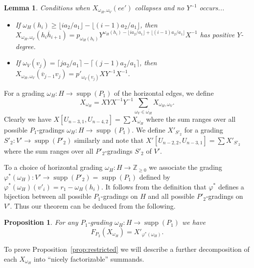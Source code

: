 \documentclass{amsart}
\newtheorem{lemma}[theorem]{Lemma}
\newtheorem{proposition}[theorem]{Proposition}
\newcommand{\ZZ}{\mathbb{Z}}
\newcommand{\supp}{\operatorname{supp}}
\begin{document}
 \begin{lemma}
  Conditions when $X_{\omega_H,\omega_V}(ee')$ collapses and no $Y^{-1}$ occurs...
  \begin{itemize}
   \item If $\omega_H(h_i)\ge\lfloor ia_2/a_1\rfloor-\lfloor (i-1)a_2/a_1\rfloor$, then $X_{\omega_H,\omega_V}(h_i\overline{h}_{i+1})=p_{\omega_H(h_i)}Y^{\omega_H(h_i)-\lfloor ia_2/a_1\rfloor+\lfloor (i-1)a_2/a_1\rfloor}X^{-1}$ has positive $Y$-degree.
   \item If $\omega_V(v_j)=\lceil ja_2/a_1\rceil-\lceil (j-1)a_2/a_1\rceil$, then $X_{\omega_H,\omega_V}(\overline{v}_{j-1}v_j)=p'_{\omega_V(v_j)}XY^{-1}X^{-1}$.
  \end{itemize}
 \end{lemma}


 

 For a grading $\omega_H:H\to\supp(P_1)$ of the horizontal edges, we define 
 \[X_{\omega_H}=XYX^{-1}Y^{-1}\sum\limits_{\omega_V\in\overline{\omega_H}}X_{\omega_H,\omega_V}.\]
 Clearly we have $X[U_{n-3,1},U_{n-4,2}]=\sum X_{\omega_H}$ where the sum ranges over all possible $P_1$-gradings $\omega_H:H\to\supp(P_1)$.  We define $X'_{S'_2}$ for a grading $S'_2:V'\to\supp(P'_2)$ similarly and note that $X'[U_{n-2,2},U_{n-3,1}]=\sum X'_{S'_2}$ where the sum ranges over all $P'_2$-gradings $S'_2$ of $V'$.

 To a choice of  horizontal grading $\omega_H:H\to\ZZ_{\ge0}$ we associate the grading $\varphi^*(\omega_H):V'\to\supp(P'_2)=\supp(P_1)$ defined by $\varphi^*(\omega_H)(v'_i)=r_1-\omega_H(h_i)$.  It follows from the definition that $\varphi^*$ defines a bijection between all possible $P_1$-gradings on $H$ and all possible $P'_2$-gradings on $V'$.  Thus our theorem can be deduced from the following.
 \begin{proposition}
  For any $P_1$-grading $\omega_H:H\to\supp(P_1)$ we have
  \[F_{P_2}(X_{\omega_H})=X'_{\varphi^*(\omega_H)}.\]
 \end{proposition}
 To prove Proposition~\ref{prop:restricted} we will describe a further decomposition of each $X_{\omega_H}$ into ``nicely factorizable'' summands.  
  
\end{document}
